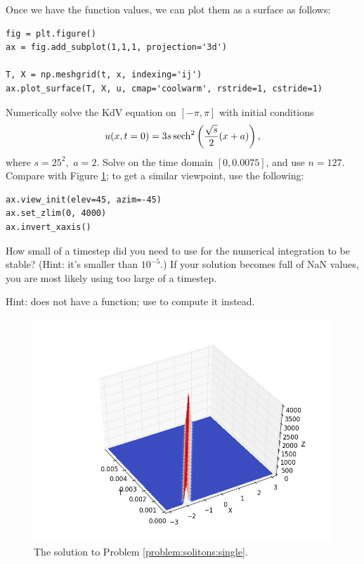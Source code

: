 \noindent
Once we have the function values, we can plot them as a surface as follows:
\begin{lstlisting}
fig = plt.figure()
ax = fig.add_subplot(1,1,1, projection='3d')

T, X = np.meshgrid(t, x, indexing='ij')
ax.plot_surface(T, X, u, cmap='coolwarm', rstride=1, cstride=1)
\end{lstlisting}

\begin{problem}
Numerically solve the KdV equation on $[-\pi,\pi]$ with initial conditions 
\[
u(x,t=0) = 3s\operatorname{sech}^2\left(\frac{\sqrt{s}}{2}(x+a)\right),
\]
where $s = 25^2,$ $a = 2$. Solve on the time domain $[0,0.0075]$, and use \(n=127\).
Compare with Figure \ref{fig:solitons:single}; to get a similar viewpoint, use the following:
\begin{lstlisting}
ax.view_init(elev=45, azim=-45)
ax.set_zlim(0, 4000)
ax.invert_xaxis()
\end{lstlisting} %
How small of a timestep did you need to use for the numerical integration to be stable?
(Hint: it's smaller than $10^{-5}$.)
If your solution becomes full of NaN values, you are most likely using too large of a timestep.
\label{problem:solitons:single}

\noindent
Hint:  does not have a  function; use  to compute it instead.
\end{problem}

\begin{figure}[H]
\centering
\includegraphics[width=\textwidth]{figures/soliton.png}
\caption{The solution to Problem \ref{problem:solitons:single}.}
\label{fig:solitons:single}
\end{figure}

